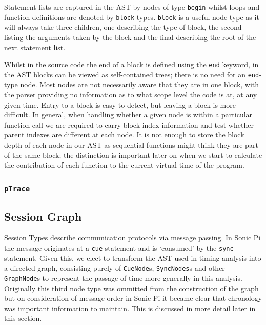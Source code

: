 \documentclass[11pt]{scrartcl}
\begin{document}

Statement lists are captured in the AST by nodes of type \texttt{begin} whilst
loops and function definitions are denoted by \texttt{block} types. 
\texttt{block} is a useful node type as it will always take three children, 
one describing the type of block, the second listing the arguments taken by 
the block and the final describing the root of the next statement list. 


Whilst in the source code the end of a block is defined using the \texttt{end}
keyword, in the AST blocks can be viewed as self-contained trees; there is
no need for an \texttt{end}-type node. Most nodes are not necessarily aware
that they are in one block, with the parser providing no information
as to what scope level the code is at, at any given time. Entry to a block is
easy to detect, but leaving a block is more difficult. In general, when handling
whether a given node is within a particular function call we are required to
carry block index information and test whether parent indexes are different
at each node. It is not enough to store the block depth of each node in our AST
as sequential functions might think they are part of the same block; the
distinction is important later on when we start to calculate the contribution
of each function to the current virtual time of the program.






\subsubsection{\texttt{pTrace}}



\subsection{Session Graph}
Session Types describe communication protocols via message passing. In Sonic Pi
the message originates at a \texttt{cue} statement and is `consumed' by the
\texttt{sync} statement. Given this, we elect to transform the AST used in
timing analysis into a directed graph, consisting purely of \texttt{CueNode}s,
\texttt{SyncNodes}s and other \texttt{GraphNode}s to represent the passage
of time more generally in this analysis. Originally this third node type
was ommitted from the construction of the graph but on consideration of
message order in Sonic Pi it became clear that chronology was important 
information to maintain. This is discussed in more detail later in this section.
\end{document}
